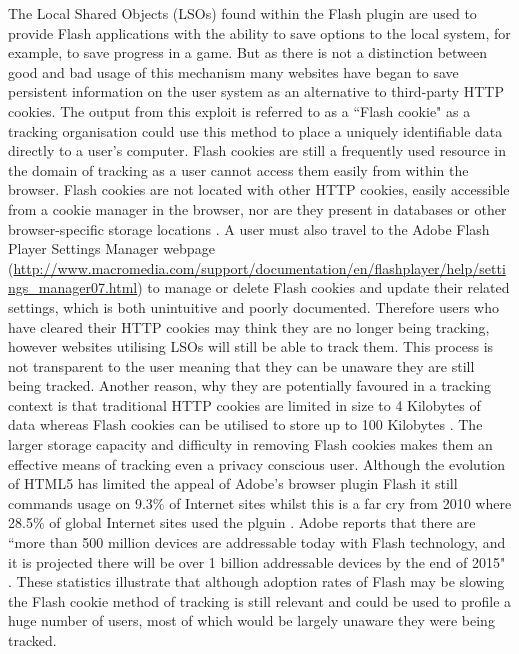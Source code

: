 \documentclass{article}
\begin{document}
The Local Shared Objects (LSOs) found within the Flash plugin are used to provide Flash applications with the ability to save options to the local system, for example, to save progress in a game. But as there is not a distinction between good and bad usage of this mechanism many websites have began to save persistent information on the user system as an alternative to third-party HTTP cookies. The output from this exploit is referred to as a ``Flash cookie" as a tracking organisation could use this method to place a uniquely identifiable data directly to a user's computer. Flash cookies are still a frequently used resource in the domain of tracking as a user cannot access them easily from within the browser. Flash cookies are not located with other HTTP cookies, easily accessible from a cookie manager in the browser, nor are they present in databases or other browser-specific storage locations \parencite{flashCookies}. A user must also travel to the Adobe Flash Player Settings Manager webpage (\url{http://www.macromedia.com/support/documentation/en/flashplayer/help/settings_manager07.html}) to manage or delete Flash cookies and update their related settings, which is both unintuitive and poorly documented. Therefore users who have cleared their HTTP cookies may think they are no longer being tracking, however websites utilising LSOs will still be able to track them. This process is not transparent to the user meaning that they can be unaware they are still being tracked. Another reason, why they are potentially favoured in a tracking context is that traditional HTTP cookies are limited in size to 4 Kilobytes of data whereas Flash cookies can be utilised to store up to 100 Kilobytes \parencite{flashCookies}. The larger storage capacity and difficulty in removing Flash cookies makes them an effective means of tracking even a privacy conscious user. Although the evolution of HTML5 has limited the appeal of Adobe's browser plugin Flash it still commands usage on 9.3\% of Internet sites whilst this is a far cry from 2010 where 28.5\% of global Internet sites used the plguin \parencite{flashStats}. Adobe reports that there are ``more than 500 million devices are addressable today with Flash technology, and it is projected there will be over 1 billion addressable devices by the end of 2015" \parencite{adobeFlash}. These statistics illustrate that although adoption rates of Flash may be slowing the Flash cookie method of tracking is still relevant and could be used to profile a huge number of users, most of which would be largely unaware they were being tracked. \newline 
\end{document}
